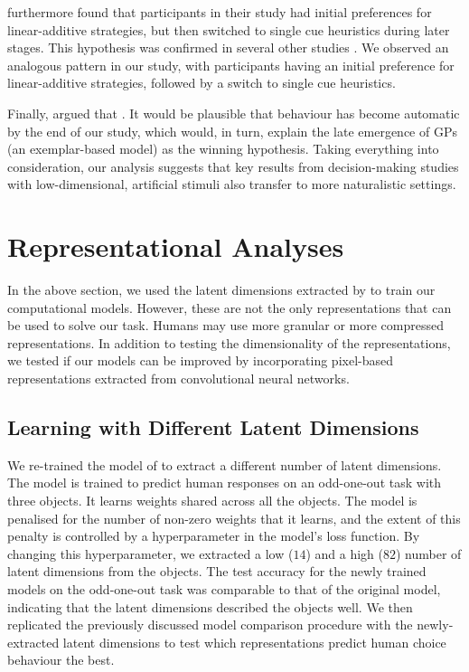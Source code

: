 \documentclass[10pt]{article}
\begin{document}
\citet{rieskamp2006ssl} furthermore found that participants in their study had initial preferences for linear-additive strategies, but then switched to single cue heuristics during later stages. This hypothesis was confirmed in several other studies \citep{gluck2002people, mata2007aging}. We observed an analogous pattern in our study, with participants having an initial preference for linear-additive strategies, followed by a switch to single cue heuristics.

Finally, \citet{juslin2003exemplar} argued that . It would be plausible that behaviour has become automatic by the end of our study, which would, in turn, explain the late emergence of GPs (an exemplar-based model) as the winning hypothesis. Taking everything into consideration, our analysis suggests that key results from decision-making studies with low-dimensional, artificial stimuli also transfer to more naturalistic settings. 

\section{Representational Analyses}

In the above section, we used the latent dimensions extracted by \citet{hebart_revealing_2020} to train our computational models. However, these are not the only representations that can be used to solve our task. Humans may use more granular or more compressed representations. In addition to testing the dimensionality of the representations, we tested if our models can be improved by incorporating pixel-based representations extracted from convolutional neural networks.

\subsection{Learning with Different Latent Dimensions}

We re-trained the model of \citet{hebart_revealing_2020} to extract a different number of latent dimensions. The model is trained to predict human responses on an odd-one-out task with three objects. It learns weights shared across all the objects. The model is penalised for the number of non-zero weights that it learns, and the extent of this penalty is controlled by a hyperparameter in the model's loss function. By changing this hyperparameter, we extracted a low ($14$) and a high ($82$) number of latent dimensions from the objects. The test accuracy for the newly trained models on the odd-one-out task was comparable to that of the original model, indicating that the latent dimensions described the objects well. We then replicated the previously discussed model comparison procedure with the newly-extracted latent dimensions to test which representations predict human choice behaviour the best.
\end{document}
